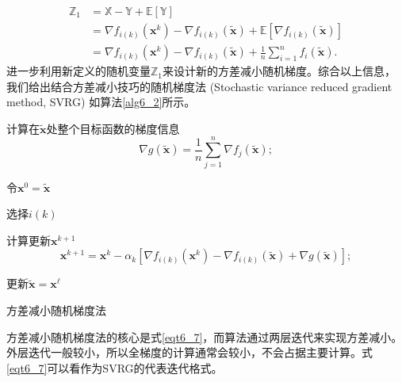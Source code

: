 \begin{equation}
    \begin{aligned}
    \mathbb{Z}_{1} &=\mathbb{X}-\mathbb{Y}+\mathbb{E}[\mathbb{Y}] \\
    &=\nabla f_{i(k)}\left(\bm{x}^{k}\right)-\nabla f_{i(k)}(\tilde{\bm{x}})+\mathbb{E}\left[\nabla f_{i(k)}(\tilde{\bm{x}})\right] \\
    &=\nabla f_{i(k)}\left(\bm{x}^{k}\right)-\nabla f_{i(k)}(\tilde{\bm{x}})+\frac{1}{n} \sum_{i=1}^{n} f_{i}(\tilde{\bm{x}}).
    \end{aligned}
    \nonumber
\end{equation}
进一步利用新定义的随机变量$\mathbb{Z}_{1}$来设计新的方差减小随机梯度。综合以上信息，我们给出结合方差减小技巧的随机梯度法 (Stochastic variance reduced gradient method, SVRG) \cite{SVRG}如算法\ref{alg6_2}所示。

\begin{algorithm}
    \SetAlgoLined

     {
        计算在$\tilde{\bm{x}}$处整个目标函数的梯度信息
            \begin{equation}
                \nabla g(\tilde{\bm{x}})=\frac{1}{n} \sum_{j=1}^{n} \nabla f_{j}(\tilde{\bm{x}});
                \nonumber
            \end{equation}
            
        令$\bm{x}^{0}=\tilde{\bm{x}}$
        
         {
            选择$i(k)$
            
            计算更新$\bm{x}^{k+1}$ 
                \begin{equation}
                    \bm{x}^{k+1}=\bm{x}^{k}-\alpha_{k}\left[\nabla f_{i(k)}\left(\bm{x}^{k}\right)-\nabla f_{i(k)}(\tilde{\bm{x}})+\nabla g(\tilde{\bm{x}})\right];
                    \label{eqt6_7}
                \end{equation}
        }
        
        更新$\tilde{\bm{x}}=\bm{x}^{\ell}$
    }
    \caption{方差减小随机梯度法}
    \label{alg6_2}
\end{algorithm}

\par 方差减小随机梯度法的核心是式\ref{eqt6_7}，而算法通过两层迭代来实现方差减小。外层迭代一般较小，所以全梯度的计算通常会较小，不会占据主要计算。式\ref{eqt6_7}可以看作为SVRG\cite{SVRG}的代表迭代格式。

